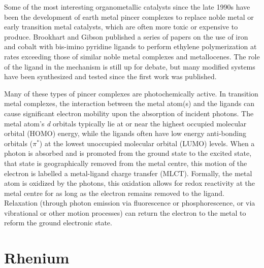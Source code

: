 Some of the most interesting organometallic catalysts since the late 1990s have been the development of earth metal pincer complexes to replace noble metal or early transition metal catalysts, which are often more toxic or expensive to produce. Brookhart and Gibson published a series of papers\autocite{small1998a, small1998b, britovsek1998, britovsek1999} on the use of iron and cobalt with bis-imino pyridine ligands to perform ethylene polymerization at rates exceeding those of similar noble metal complexes and metallocenes\autocite{gibson2007}. The role of the ligand in the mechanism is still up for debate, but many modified systems have been synthesized and tested since the first work was published\autocite{boudier2014}.

Many of these types of pincer complexes are photochemically active. In transition metal complexes, the interaction between the metal atom(s) and the ligands can cause significant electron mobility upon the absorption of incident photons. The metal atom's \textit{d} orbitals typically lie at or near the highest occupied molecular orbital (HOMO) energy, while the ligands often have low energy anti-bonding orbitals ($\pi^\ast$) at the lowest unoccupied molecular orbital (LUMO) levels. When a photon is absorbed and is promoted from the ground state to the excited state, that state is geographically removed from the metal centre, this motion of the electron is labelled a metal-ligand charge transfer (MLCT). Formally, the metal atom is oxidized by the photons, this oxidation allows for redox reactivity at the metal centre for as long as the electron remains removed to the ligand. Relaxation (through photon emission via fluorescence or phosphorescence, or via vibrational or other motion processes) can return the electron to the metal to reform the ground electronic state. 



\section{Rhenium}

